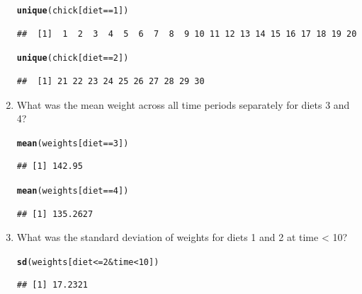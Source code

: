 \documentclass{tufte-book}\usepackage[]{graphicx}\usepackage[]{color}
\makeatletter
\newcommand{\hlnum}[1]{\textcolor[rgb]{0.686,0.059,0.569}{#1}}%
\newcommand{\hlopt}[1]{\textcolor[rgb]{0,0,0}{#1}}%
\newcommand{\hlstd}[1]{\textcolor[rgb]{0.345,0.345,0.345}{#1}}%
\newcommand{\hlkwd}[1]{\textcolor[rgb]{0.737,0.353,0.396}{\textbf{#1}}}%
\newenvironment{kframe}{%
 \def\at@end@of@kframe{}%
 \ifinner\ifhmode%
  \def\at@end@of@kframe{\end{minipage}}%
  \begin{minipage}{\columnwidth}%
 \fi\fi%
 \def\FrameCommand##1{\hskip\@totalleftmargin \hskip-\fboxsep
 \colorbox{shadecolor}{##1}\hskip-\fboxsep
     \hskip-\linewidth \hskip-\@totalleftmargin \hskip\columnwidth}%
 \MakeFramed {\advance\hsize-\width
   \@totalleftmargin\z@ \linewidth\hsize
   \@setminipage}}%
 {\par\unskip\endMakeFramed%
 \at@end@of@kframe}
\newenvironment{knitrout}{}{} %
\makeatother
\begin{document}
\begin{enumerate}
\begin{knitrout}
\color{fgcolor}\begin{kframe}
\begin{alltt}
\hlkwd{unique}\hlstd{(chick[diet} \hlopt{==} \hlnum{1}\hlstd{])}
\end{alltt}
\begin{verbatim}
##  [1]  1  2  3  4  5  6  7  8  9 10 11 12 13 14 15 16 17 18 19 20
\end{verbatim}
\begin{alltt}
\hlkwd{unique}\hlstd{(chick[diet} \hlopt{==} \hlnum{2}\hlstd{])}
\end{alltt}
\begin{verbatim}
##  [1] 21 22 23 24 25 26 27 28 29 30
\end{verbatim}
\end{kframe}
\end{knitrout}

  \item What was the mean weight across all time periods separately for diets 3 and 4?

\begin{knitrout}
\color{fgcolor}\begin{kframe}
\begin{alltt}
\hlkwd{mean}\hlstd{(weights[diet} \hlopt{==} \hlnum{3}\hlstd{])}
\end{alltt}
\begin{verbatim}
## [1] 142.95
\end{verbatim}
\begin{alltt}
\hlkwd{mean}\hlstd{(weights[diet} \hlopt{==} \hlnum{4}\hlstd{])}
\end{alltt}
\begin{verbatim}
## [1] 135.2627
\end{verbatim}
\end{kframe}
\end{knitrout}

  \item What was the standard deviation of weights for diets 1 and 2 at time < 10?

\begin{knitrout}
\color{fgcolor}\begin{kframe}
\begin{alltt}
\hlkwd{sd}\hlstd{(weights[diet} \hlopt{<=} \hlnum{2} \hlopt{&} \hlstd{time} \hlopt{<} \hlnum{10}\hlstd{])}
\end{alltt}
\begin{verbatim}
## [1] 17.2321
\end{verbatim}
\end{kframe}
\end{knitrout}


\end{enumerate}
\end{document}
